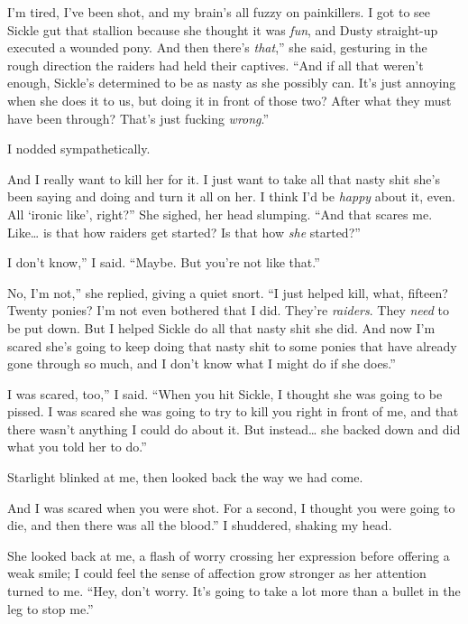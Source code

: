 \leavevmode{}I’m tired, I’ve been shot, and my brain’s all fuzzy on painkillers. I got to see Sickle gut that stallion because she thought it was \textit{fun}, and Dusty straight-up executed a wounded pony. And then there’s \textit{that},” she said, gesturing in the rough direction the raiders had held their captives. “And if all that weren’t enough, Sickle’s determined to be as nasty as she possibly can. It’s just annoying when she does it to us, but doing it in front of those two? After what they must have been through? That’s just fucking \textit{wrong}.”

I nodded sympathetically.

\leavevmode{}And I really want to kill her for it. I just want to take all that nasty shit she’s been saying and doing and turn it all on her. I think I’d be \textit{happy} about it, even. All ‘ironic like’, right?” She sighed, her head slumping. “And that scares me. Like… is that how raiders get started? Is that how \textit{she} started?”

\leavevmode{}I don’t know,” I said. “Maybe. But you’re not like that.”

\leavevmode{}No, I’m not,” she replied, giving a quiet snort. “I just helped kill, what, fifteen? Twenty ponies? I’m not even bothered that I did. They’re \textit{raiders}. They \textit{need} to be put down. But I helped Sickle do all that nasty shit she did. And now I’m scared she’s going to keep doing that nasty shit to some ponies that have already gone through so much, and I don’t know what I might do if she does.”

\leavevmode{}I was scared, too,” I said. “When you hit Sickle, I thought she was going to be pissed. I was scared she was going to try to kill you right in front of me, and that there wasn’t anything I could do about it. But instead… she backed down and did what you told her to do.”

Starlight blinked at me, then looked back the way we had come.

\leavevmode{}And I was scared when you were shot. For a second, I thought you were going to die, and then there was all the blood.” I shuddered, shaking my head.

She looked back at me, a flash of worry crossing her expression before offering a weak smile; I could feel the sense of affection grow stronger as her attention turned to me. “Hey, don’t worry. It’s going to take a lot more than a bullet in the leg to stop me.”


